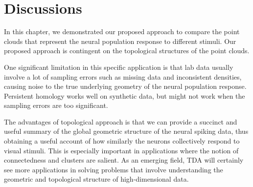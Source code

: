 \section{Discussions}
In this chapter, we demonstrated our proposed approach to compare the point clouds that represent the neural population response to different stimuli. Our proposed approach is contingent on the topological structures of the point clouds.  

One significant limitation in this specific application is that lab data usually involve a lot of sampling errors such as missing data and inconsistent densities, causing noise to the true underlying geometry of the neural population response. Persistent homology works well on synthetic data, but might not work when the sampling errors are too significant.

The advantages of topological approach is that we can provide a succinct and useful summary of the global geometric structure of the neural spiking data, thus obtaining a useful account of how similarly the neurons collectively respond to visual stimuli. This is especially important in applications where the notion of connectedness and clusters are salient. As an emerging field, TDA will certainly see more applications in solving problems that involve understanding the geometric and topological structure of high-dimensional data.
